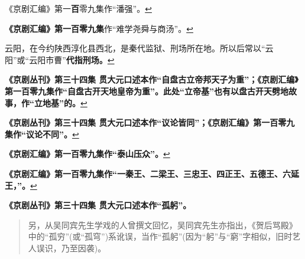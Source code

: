   《京剧汇编》第一\textbf{百}零九集作``潘强''。\protect\hyperlink{fnref438}{↩}
\item
  \leavevmode\hypertarget{fn439}{}%
  \textbf{《京剧汇编》第一百零九集}作``难学尧舜与商汤''。\protect\hyperlink{fnref439}{↩}
\item
  \leavevmode\hypertarget{fn440}{}%
  云阳，在今约陕西淳化县西北，是秦代监狱、刑场所在地。所以后常以``云阳''或``云阳市曹''\textbf{代指刑场。}\protect\hyperlink{fnref440}{↩}
\item
  \leavevmode\hypertarget{fn441}{}%
  \textbf{《京剧丛刊》第三十四集
  贯大元口述本作``自盘古立帝邦天子为重''；《京剧汇编》第一百零九集作``自盘古开天地皇帝为重''。此处``立帝基''也有以盘古开天劈地故事，作``立地基''的。}\protect\hyperlink{fnref441}{↩}
\item
  \leavevmode\hypertarget{fn442}{}%
  \textbf{《京剧丛刊》第三十四集
  贯大元口述本作``议论皆同''；《京剧汇编》第一百零九集作``议论不同''。}\protect\hyperlink{fnref442}{↩}
\item
  \leavevmode\hypertarget{fn443}{}%
  \textbf{《京剧汇编》第一百零九集作``泰山压众''。}\protect\hyperlink{fnref443}{↩}
\item
  \leavevmode\hypertarget{fn444}{}%
  \textbf{《京剧汇编》第一百零九集作``一秦王、二梁王、三忠王、四正王、五德王、六延王，''。}\protect\hyperlink{fnref444}{↩}
\item
  \leavevmode\hypertarget{fn445}{}%
  \textbf{《京剧丛刊》第三十四集 贯大元口述本作``孤躬''。}

  \begin{quote}
  另，从吴同宾先生学戏的人曾撰文回忆，吴同宾先生亦指出，《贺后骂殿》中的``孤穷''(或``孤穹'')系讹误，当作``孤躬''(因为``躬''与``窮''字相似，旧时艺人误识，乃至因袭)。
  \end{quote}

